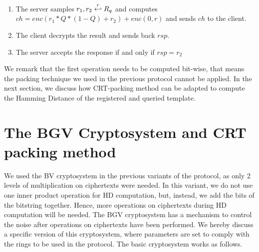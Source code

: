 \begin{enumerate}
\item The server samples \(r_{1}, r_{2} \stackrel{r}{\hookleftarrow} R_{q}\) and computes
    \(ch = enc(r_{1}*Q*(1-Q) + r_{2}) + enc(0,r)\) and sends \(ch\) to the
    client.
\item The client decrypts the result and sends back \(rsp\).
\item The server accepts the response if and only if \(rsp = r_{2} \)
\end{enumerate}
We remark that the first operation needs to be computed bit-wise, that means the
packing technique we used in the previous protocol cannot be applied. In the
next section, we discuss how CRT-packing method \cite{smart2014fully} can be adapted
to compute the Hamming Distance of the registered and queried template.

\section{The BGV Cryptosystem and CRT packing method}
\label{sec:6bgv}

We used the BV cryptosystem \cite{brakerski2011fully} in the previous variants of
the protocol, as only 2 levels of multiplication on ciphertexts were needed. In
this variant, we do not use one inner product operation for HD computation,  but, instead, we 
add the bits of the bitstring together. Hence, more operations on ciphertexts
during HD computation will be needed. The BGV cryptosystem
\cite{brakerski2014leveled} has a mechanism to control the noise after
operations on ciphertexts have been performed. We hereby discuss a specific version of this
cryptosystem, where parameters are set to comply with the rings to be used in
the protocol. The basic cryptosystem works as follows.

